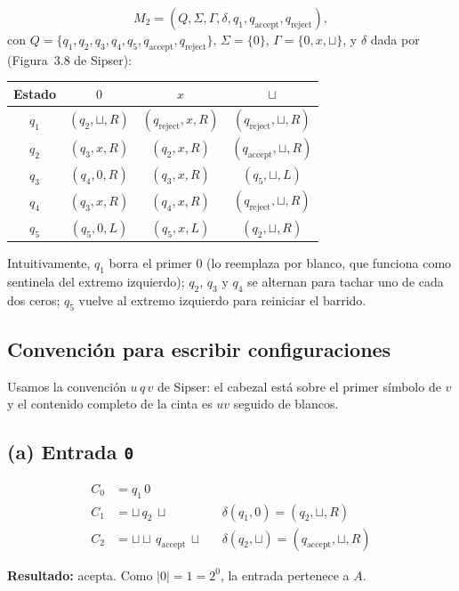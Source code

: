 \documentclass[11pt,a4paper]{article}
\theoremstyle{plain}
\theoremstyle{definition}
\theoremstyle{remark}
\newcommand{\qaccept}{q_{\text{accept}}}
\newcommand{\qreject}{q_{\text{reject}}}
\newcommand{\blank}{\sqcup}
\begin{document}
\[
  M_2 = (Q, \Sigma, \Gamma, \delta, q_1, \qaccept, \qreject),
\]
con $Q=\{q_1, q_2, q_3, q_4, q_5, \qaccept, \qreject\}$, $\Sigma=\{0\}$,
$\Gamma=\{0, x, \blank\}$, y $\delta$ dada por (Figura~3.8 de Sipser):

\begin{center}
\begin{tabular}{c|c|c|c}
\toprule
Estado & $0$ & $x$ & $\blank$ \\
\midrule
$q_1$ & $(q_2,\blank,R)$ & $(\qreject,x,R)$    & $(\qreject,\blank,R)$ \\
$q_2$ & $(q_3,x,R)$      & $(q_2,x,R)$         & $(\qaccept,\blank,R)$ \\
$q_3$ & $(q_4,0,R)$      & $(q_3,x,R)$         & $(q_5,\blank,L)$      \\
$q_4$ & $(q_3,x,R)$      & $(q_4,x,R)$         & $(\qreject,\blank,R)$ \\
$q_5$ & $(q_5,0,L)$      & $(q_5,x,L)$         & $(q_2,\blank,R)$      \\
\bottomrule
\end{tabular}
\end{center}

Intuitivamente, $q_1$ borra el primer $0$ (lo reemplaza por blanco, que
funciona como sentinela del extremo izquierdo); $q_2$, $q_3$ y $q_4$ se
alternan para tachar uno de cada dos ceros; $q_5$ vuelve al extremo izquierdo
para reiniciar el barrido.

\subsection*{Convenci\'on para escribir configuraciones}

Usamos la convenci\'on $u\,q\,v$ de Sipser: el cabezal est\'a sobre el primer
s\'imbolo de $v$ y el contenido completo de la cinta es $uv$ seguido de
blancos.

\subsection*{(a) Entrada \texttt{0}}

\begin{align*}
C_0 &= q_1\,0 \\
C_1 &= \blank\,q_2\,\blank
       &&\delta(q_1,0)=(q_2,\blank,R)\\
C_2 &= \blank\blank\,\qaccept\,\blank
       &&\delta(q_2,\blank)=(\qaccept,\blank,R)
\end{align*}

\textbf{Resultado:} acepta. Como $|0|=1=2^0$, la entrada pertenece a $A$.
\end{document}
